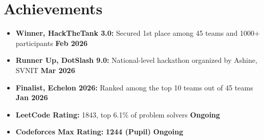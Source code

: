 \documentclass[a4paper,10pt]{article}
\begin{document}
\section*{\textbf{Achievements}}
\begin{itemize}
  \item \textbf{Winner, HackTheTank 3.0:} Secured 1st place among 45 teams and 1000+ participants \hfill \textbf{Feb 2026}
  \item \textbf{Runner Up, DotSlash 9.0:} National-level hackathon organized by Ashine, SVNIT \hfill \textbf{Mar 2026}
  \item \textbf{Finalist, Echelon 2026:} Ranked among the top 10 teams out of 45 teams \hfill \textbf{Jan 2026}
  \item \textbf{LeetCode Rating:} 1843, top 6.1\% of problem solvers \hfill \textbf{Ongoing}
  \item \textbf{Codeforces Max Rating:} \textbf{1244 (Pupil)} \hfill \textbf{Ongoing}
\end{itemize}
\vspace{-10pt}
\end{document}
